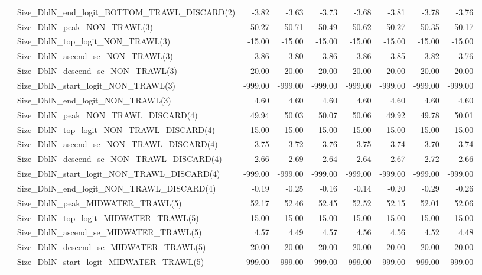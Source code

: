 \documentclass[
]{scrartcl}
\begin{document}
\begin{landscape}
\begin{longtable}{llrrrrrrr}
 & Size\_DblN\_end\_logit\_BOTTOM\_TRAWL\_DISCARD(2) & -3.82 & -3.63 & -3.73 & -3.68 & -3.81 & -3.78 & -3.76 \\ 
 & Size\_DblN\_peak\_NON\_TRAWL(3) & 50.27 & 50.71 & 50.49 & 50.62 & 50.27 & 50.35 & 50.17 \\ 
 & Size\_DblN\_top\_logit\_NON\_TRAWL(3) & -15.00 & -15.00 & -15.00 & -15.00 & -15.00 & -15.00 & -15.00 \\ 
 & Size\_DblN\_ascend\_se\_NON\_TRAWL(3) & 3.86 & 3.80 & 3.86 & 3.86 & 3.85 & 3.82 & 3.76 \\ 
 & Size\_DblN\_descend\_se\_NON\_TRAWL(3) & 20.00 & 20.00 & 20.00 & 20.00 & 20.00 & 20.00 & 20.00 \\ 
 & Size\_DblN\_start\_logit\_NON\_TRAWL(3) & -999.00 & -999.00 & -999.00 & -999.00 & -999.00 & -999.00 & -999.00 \\ 
 & Size\_DblN\_end\_logit\_NON\_TRAWL(3) & 4.60 & 4.60 & 4.60 & 4.60 & 4.60 & 4.60 & 4.60 \\ 
 & Size\_DblN\_peak\_NON\_TRAWL\_DISCARD(4) & 49.94 & 50.03 & 50.07 & 50.06 & 49.92 & 49.78 & 50.01 \\ 
 & Size\_DblN\_top\_logit\_NON\_TRAWL\_DISCARD(4) & -15.00 & -15.00 & -15.00 & -15.00 & -15.00 & -15.00 & -15.00 \\ 
 & Size\_DblN\_ascend\_se\_NON\_TRAWL\_DISCARD(4) & 3.75 & 3.72 & 3.76 & 3.75 & 3.74 & 3.70 & 3.74 \\ 
 & Size\_DblN\_descend\_se\_NON\_TRAWL\_DISCARD(4) & 2.66 & 2.69 & 2.64 & 2.64 & 2.67 & 2.72 & 2.66 \\ 
 & Size\_DblN\_start\_logit\_NON\_TRAWL\_DISCARD(4) & -999.00 & -999.00 & -999.00 & -999.00 & -999.00 & -999.00 & -999.00 \\ 
 & Size\_DblN\_end\_logit\_NON\_TRAWL\_DISCARD(4) & -0.19 & -0.25 & -0.16 & -0.14 & -0.20 & -0.29 & -0.26 \\ 
 & Size\_DblN\_peak\_MIDWATER\_TRAWL(5) & 52.17 & 52.46 & 52.45 & 52.52 & 52.15 & 52.01 & 52.06 \\ 
 & Size\_DblN\_top\_logit\_MIDWATER\_TRAWL(5) & -15.00 & -15.00 & -15.00 & -15.00 & -15.00 & -15.00 & -15.00 \\ 
 & Size\_DblN\_ascend\_se\_MIDWATER\_TRAWL(5) & 4.57 & 4.49 & 4.57 & 4.56 & 4.56 & 4.52 & 4.48 \\ 
 & Size\_DblN\_descend\_se\_MIDWATER\_TRAWL(5) & 20.00 & 20.00 & 20.00 & 20.00 & 20.00 & 20.00 & 20.00 \\ 
 & Size\_DblN\_start\_logit\_MIDWATER\_TRAWL(5) & -999.00 & -999.00 & -999.00 & -999.00 & -999.00 & -999.00 & -999.00 \\ 

\end{longtable}
\end{landscape}
\end{document}

